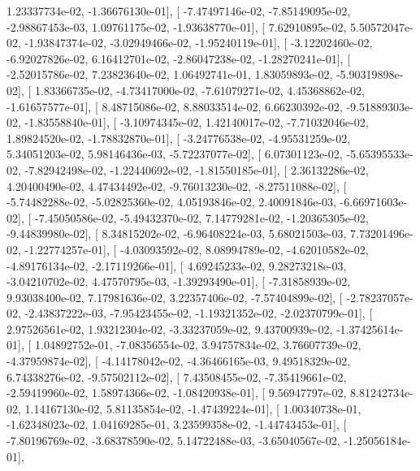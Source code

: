 \documentclass{article}
\begin{document}
          1.23337734e-02,  -1.36676130e-01],
       [ -7.47497146e-02,  -7.85149095e-02,  -2.98867453e-03,
          1.09761175e-02,  -1.93638770e-01],
       [  7.62910895e-02,   5.50572047e-02,  -1.93847374e-02,
         -3.02949466e-02,  -1.95240119e-01],
       [ -3.12202460e-02,  -6.92027826e-02,   6.16412701e-02,
         -2.86047238e-02,  -1.28270241e-01],
       [ -2.52015786e-02,   7.23823640e-02,   1.06492741e-01,
          1.83059893e-02,  -5.90319898e-02],
       [  1.83366735e-02,  -4.73417000e-02,  -7.61079271e-02,
          4.45368862e-02,  -1.61657577e-01],
       [  8.48715086e-02,   8.88033514e-02,   6.66230392e-02,
         -9.51889303e-02,  -1.83558840e-01],
       [ -3.10974345e-02,   1.42140017e-02,  -7.71032046e-02,
          1.89824520e-02,  -1.78832870e-01],
       [ -3.24776538e-02,  -4.95531259e-02,   5.34051203e-02,
          5.98146436e-03,  -5.72237077e-02],
       [  6.07301123e-02,  -5.65395533e-02,  -7.82942498e-02,
         -1.22440692e-02,  -1.81550185e-01],
       [  2.36132286e-02,   4.20400490e-02,   4.47434492e-02,
         -9.76013230e-02,  -8.27511088e-02],
       [ -5.74482288e-02,  -5.02825360e-02,   4.05193846e-02,
          2.40091846e-03,  -6.66971603e-02],
       [ -7.45050586e-02,  -5.49432370e-02,   7.14779281e-02,
         -1.20365305e-02,  -9.44839980e-02],
       [  8.34815202e-02,  -6.96408224e-03,   5.68021503e-03,
          7.73201496e-02,  -1.22774257e-01],
       [ -4.03093592e-02,   8.08994789e-02,  -4.62010582e-02,
         -4.89176134e-02,  -2.17119266e-01],
       [  4.69245233e-02,   9.28273218e-03,  -3.04210702e-02,
          4.47570795e-03,  -1.39293490e-01],
       [ -7.31858939e-02,   9.93038400e-02,   7.17981636e-02,
          3.22357406e-02,  -7.57404899e-02],
       [ -2.78237057e-02,  -2.43837222e-03,  -7.95423455e-02,
         -1.19321352e-02,  -2.02370799e-01],
       [  2.97526561e-02,   1.93212304e-02,  -3.33237059e-02,
          9.43700939e-02,  -1.37425614e-01],
       [  1.04892752e-01,  -7.08356554e-02,   3.94757834e-02,
          3.76607739e-02,  -4.37959874e-02],
       [ -4.14178042e-02,  -4.36466165e-03,   9.49518329e-02,
          6.74338276e-02,  -9.57502112e-02],
       [  7.43508455e-02,  -7.35419661e-02,  -2.59419960e-02,
          1.58974366e-02,  -1.08420938e-01],
       [  9.56947797e-02,   8.81242734e-02,   1.14167130e-02,
          5.81135854e-02,  -1.47439224e-01],
       [  1.00340738e-01,  -1.62348023e-02,   1.04169285e-01,
          3.23599358e-02,  -1.44743453e-01],
       [ -7.80196769e-02,  -3.68378590e-02,   5.14722488e-03,
         -3.65040567e-02,  -1.25056184e-01],
\end{document}
